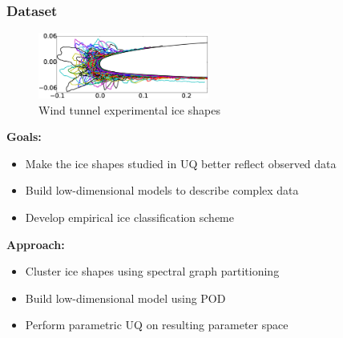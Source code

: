 \documentclass[9pt]{beamer}
\begin{document}
\begin{frame}
\frametitle{Dataset}
\label{sec-3-14}

\vspace*{-0.0cm}\begin{figure}
      \includegraphics[width=0.5\textwidth]{GlobalDataSet}
      \caption{Wind tunnel experimental ice shapes}
\end{figure}
\textbf{Goals:}
\begin{itemize}
\item Make the ice shapes studied in UQ better reflect observed data
\item Build low-dimensional models to describe complex data
\item Develop empirical ice classification scheme
\end{itemize}
\textbf{Approach:}
\begin{itemize}
\item Cluster ice shapes using spectral graph partitioning
\item Build low-dimensional model using POD
\item Perform parametric UQ on resulting parameter space
\end{itemize}
\end{frame}
\end{document}
